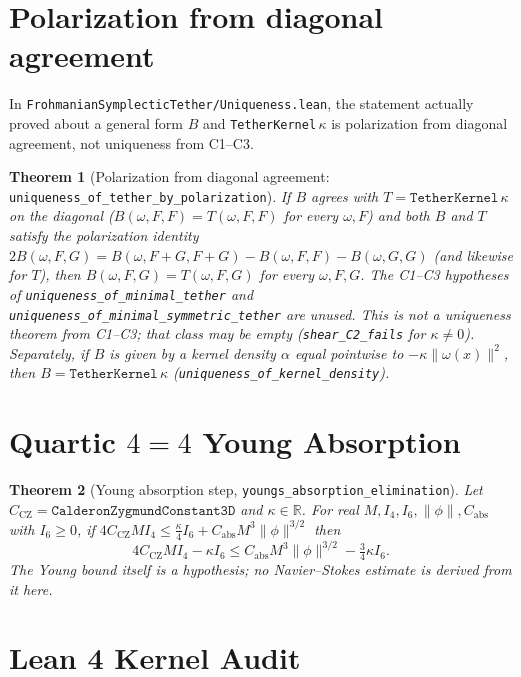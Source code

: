\documentclass[11pt,a4paper]{article}
\newtheorem{theorem}{Theorem}[section]
\theoremstyle{definition}
\begin{document}
\section{Polarization from diagonal agreement}

In \texttt{FrohmanianSymplecticTether/Uniqueness.lean}, the statement actually proved about a general form $B$ and \texttt{TetherKernel}\,$\kappa$ is polarization from diagonal agreement, not uniqueness from C1--C3.

\begin{theorem}[Polarization from diagonal agreement: \texttt{uniqueness\_of\_tether\_by\_polarization}]
If $B$ agrees with $T=\texttt{TetherKernel}\,\kappa$ on the diagonal ($B(\omega,F,F)=T(\omega,F,F)$ for every $\omega,F$) and both $B$ and $T$ satisfy the polarization identity $2B(\omega,F,G)=B(\omega,F+G,F+G)-B(\omega,F,F)-B(\omega,G,G)$ (and likewise for $T$), then $B(\omega,F,G)=T(\omega,F,G)$ for every $\omega,F,G$. The C1--C3 hypotheses of \texttt{uniqueness\_of\_minimal\_tether} and \texttt{uniqueness\_of\_minimal\_symmetric\_tether} are unused. This is not a uniqueness theorem from C1--C3; that class may be empty (\texttt{shear\_C2\_fails} for $\kappa\neq0$). Separately, if $B$ is given by a kernel density $\alpha$ equal pointwise to $-\kappa\|\omega(x)\|^2$, then $B=\texttt{TetherKernel}\,\kappa$ (\texttt{uniqueness\_of\_kernel\_density}).
\end{theorem}

\section{Quartic $4 = 4$ Young Absorption}

\begin{theorem}[Young absorption step, \texttt{youngs\_absorption\_elimination}]
Let $C_{\mathrm{CZ}}=\texttt{CalderonZygmundConstant3D}$ and $\kappa\in\mathbb{R}$. For real $M, I_4, I_6, \|\phi\|, C_{\mathrm{abs}}$ with $I_6\ge0$, if $4C_{\mathrm{CZ}}MI_4\le\frac{\kappa}{4}I_6+C_{\mathrm{abs}}M^3\|\phi\|^{3/2}$ then
\begin{equation}
  4C_{\mathrm{CZ}}MI_4-\kappa I_6\le C_{\mathrm{abs}}M^3\|\phi\|^{3/2}-\tfrac34\kappa I_6.
  \label{eq:young-4-eq-4}
\end{equation}
The Young bound itself is a hypothesis; no Navier--Stokes estimate is derived from it here.
\end{theorem}

\section{Lean 4 Kernel Audit}
\end{document}
